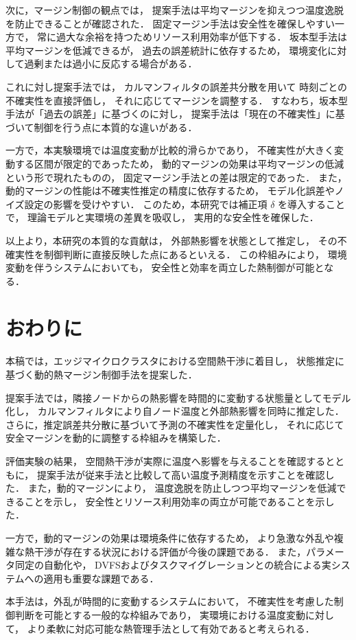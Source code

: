 \documentclass[techrep]{ipsj}
\begin{document}
次に，マージン制御の観点では，
提案手法は平均マージンを抑えつつ温度逸脱を防止できることが確認された．
固定マージン手法は安全性を確保しやすい一方で，
常に過大な余裕を持つためリソース利用効率が低下する．
坂本型手法は平均マージンを低減できるが，
過去の誤差統計に依存するため，
環境変化に対して過剰または過小に反応する場合がある．

これに対し提案手法では，
カルマンフィルタの誤差共分散を用いて
時刻ごとの不確実性を直接評価し，
それに応じてマージンを調整する．
すなわち，坂本型手法が「過去の誤差」に基づくのに対し，
提案手法は「現在の不確実性」に基づいて制御を行う点に本質的な違いがある．

一方で，本実験環境では温度変動が比較的滑らかであり，
不確実性が大きく変動する区間が限定的であったため，
動的マージンの効果は平均マージンの低減という形で現れたものの，
固定マージン手法との差は限定的であった．
また，動的マージンの性能は不確実性推定の精度に依存するため，
モデル化誤差やノイズ設定の影響を受けやすい．
このため，本研究では補正項 $\delta$ を導入することで，
理論モデルと実環境の差異を吸収し，
実用的な安全性を確保した．

以上より，本研究の本質的な貢献は，
外部熱影響を状態として推定し，
その不確実性を制御判断に直接反映した点にあるといえる．
この枠組みにより，
環境変動を伴うシステムにおいても，
安全性と効率を両立した熱制御が可能となる．


\section{おわりに}

本稿では，エッジマイクロクラスタにおける空間熱干渉に着目し，
状態推定に基づく動的熱マージン制御手法を提案した．

提案手法では，隣接ノードからの熱影響を時間的に変動する状態量としてモデル化し，
カルマンフィルタにより自ノード温度と外部熱影響を同時に推定した．
さらに，推定誤差共分散に基づいて予測の不確実性を定量化し，
それに応じて安全マージンを動的に調整する枠組みを構築した．

評価実験の結果，
空間熱干渉が実際に温度へ影響を与えることを確認するとともに，
提案手法が従来手法と比較して高い温度予測精度を示すことを確認した．
また，動的マージンにより，
温度逸脱を防止しつつ平均マージンを低減できることを示し，
安全性とリソース利用効率の両立が可能であることを示した．

一方で，動的マージンの効果は環境条件に依存するため，
より急激な外乱や複雑な熱干渉が存在する状況における評価が今後の課題である．
また，パラメータ同定の自動化や，
DVFSおよびタスクマイグレーションとの統合による実システムへの適用も重要な課題である．

本手法は，外乱が時間的に変動するシステムにおいて，
不確実性を考慮した制御判断を可能とする一般的な枠組みであり，
実環境における温度変動に対して，
より柔軟に対応可能な熱管理手法として有効であると考えられる．



\end{document}
